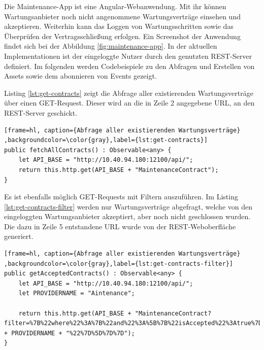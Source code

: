 Die Maintenance-App ist eine Angular-Webanwendung. Mit ihr können Wartungsanbieter noch nicht angenommene Wartungsverträge einsehen und akzeptieren. Weiterhin kann das Loggen von Wartungsschritten sowie das Überprüfen der Vertragsschließung erfolgen. Ein Screenshot der Anwendung findet sich bei der Abbildung \ref{fig:maintenance-app}. In der aktuellen Implementationen ist der eingeloggte Nutzer durch den genutzten REST-Server definiert. Im folgenden werden Codebeispiele zu den Abfragen und Erstellen von Assets sowie dem abonnieren von Events gezeigt.

Listing \ref{lst:get-contracts} zeigt die Abfrage aller existierenden Wartungsverträge über einen GET-Request. Dieser wird an die in Zeile 2 angegebene URL, an den REST-Server geschickt.

\begin{lstfloat}
\begin{lstlisting}[frame=hl, caption={Abfrage aller existierenden Wartungsverträge} ,backgroundcolor=\color{gray},label={lst:get-contracts}]
public fetchAllContracts() : Observable<any> {
    let API_BASE = "http://10.40.94.180:12100/api/";
    return this.http.get(API_BASE + "MaintenanceContract");
}
\end{lstlisting} 
\end{lstfloat}

Es ist ebenfalls möglich GET-Requests mit Filtern auszuführen. Im Listing \ref{lst:get-contracts-filter} werden nur Wartungsverträge abgefragt, welche von den eingeloggten Wartungsanbieter akzeptiert, aber noch nicht geschlossen wurden. Die dazu in Zeile 5 entstandene URL wurde von der REST-Weboberfläche generiert. 

\begin{lstfloat}
\begin{lstlisting}[frame=hl, caption={Abfrage aller existierenden Wartungsverträge} ,backgroundcolor=\color{gray},label={lst:get-contracts-filter}]
public getAcceptedContracts() : Observable<any> {
    let API_BASE = "http://10.40.94.180:12100/api/";
    let PROVIDERNAME = "Aintenance";

    return this.http.get(API_BASE + "MaintenanceContract?filter=%7B%22where%22%3A%7B%22and%22%3A%5B%7B%22isAccepted%22%3Atrue%7D%2C%7B%22isClosed%22%3Afalse%7D%2C%20%7B%22maintenanceProvider%22%3A%22resource%3Abiz.innovationcenter.maintenance.MaintenanceProvider%23" + PROVIDERNAME + "%22%7D%5D%7D%7D");
}
\end{lstlisting} 
\end{lstfloat}

